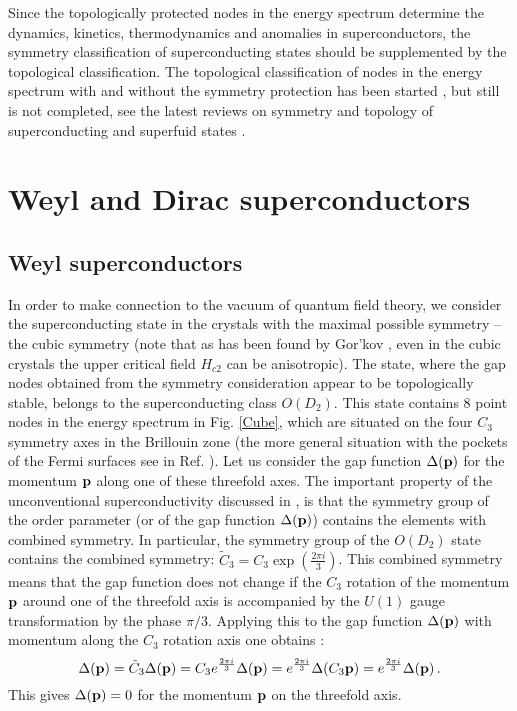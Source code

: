 \documentclass[prb,
superscriptaddress,showpacs,amsmath,amssymb]{revtex4}
\begin{document}
Since the topologically protected nodes in the energy spectrum determine the dynamics, kinetics,   thermodynamics and anomalies in superconductors,  the symmetry classification of superconducting states should be supplemented by the 
topological classification. The topological classification of nodes in the energy spectrum with and without the symmetry protection has been started \cite{Horava2005}, but still is not completed, see the latest reviews on symmetry and topology of superconducting and superfuid states \cite{Mizushima2016,Sato2016}.



\section{Weyl and Dirac superconductors}
\label{WeylDiracSuperconductor}

\subsection{Weyl superconductors}
\label{WeylSuperconductor}



In order to make connection to the vacuum of quantum field theory, we  consider the superconducting state in the crystals with the maximal possible symmetry -- the cubic symmetry (note that as has been found by Gor'kov \cite{Gorkov1984},  even in the cubic crystals the upper critical field $H_{c2}$ can be anisotropic). The state, where the gap nodes obtained from the symmetry consideration appear to be topologically stable, belongs to the superconducting class $O(D_2)$. This state contains 8 point nodes in the energy spectrum in Fig. \ref{Cube}, which are situated on the four $C_3$ symmetry axes in the Brillouin zone (the more general situation with the pockets of the Fermi surfaces see in Ref. \cite{Agterberg1999}). Let us consider the gap function $\Delta({\bf p})$ for the momentum ${\bf p}$ along one of these threefold axes.
The important property of the unconventional superconductivity discussed in   \cite{VolovikGorkov1984,VolovikGorkov1985}, is that the symmetry group of the order parameter (or of the gap function $\Delta({\bf p})$) contains the elements with combined symmetry. In particular,
the symmetry group of the $O(D_2)$ state contains the combined symmetry: 
$\tilde C_3= C_3\exp\left(\frac{2\pi i}{3}\right)$. This combined symmetry means that the gap function does not change if the $C_3$ rotation of the momentum ${\bf p}$ around one of the threefold axis is accompanied by the $U(1)$ gauge transformation by the phase $\pi/3$.
Applying this to the gap function $\Delta({\bf p})$ with momentum along the $C_3$ rotation axis one obtains \cite{VolovikGorkov1985}:
\begin{equation}
\Delta({\bf p})=\tilde C_3\Delta({\bf p})= C_3e^\frac{2\pi i}{3}\Delta({\bf p})=
e^\frac{2\pi i}{3}\Delta(C_3{\bf p})= e^\frac{2\pi i}{3}\Delta({\bf p})\,.
\label{C3}
\end{equation}
This gives $\Delta({\bf p})=0$ for the momentum ${\bf p}$ on the threefold axis.
\end{document}
